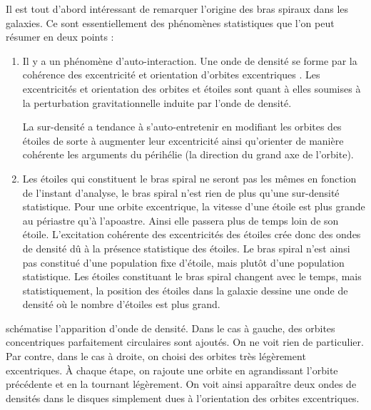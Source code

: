 \bigskip

Il est tout d'abord intéressant de remarquer l'origine des bras spiraux dans les galaxies. Ce sont essentiellement des phénomènes statistiques que l'on peut résumer en deux points : 
\begin{enumerate}
\item Il y a un phénomène d'auto-interaction. Une onde de densité se forme par la cohérence des excentricité et orientation d'orbites excentriques . Les excentricités et orientation des orbites et étoiles sont quant à elles soumises à la perturbation gravitationnelle induite par l'onde de densité. 

La sur-densité a tendance à s'auto-entretenir en modifiant les orbites des étoiles de sorte à augmenter leur excentricité ainsi qu'orienter de manière cohérente les arguments du périhélie (la direction du grand axe de l'orbite).
\item Les étoiles qui constituent le bras spiral ne seront pas les mêmes en fonction de l'instant d'analyse, le bras spiral n'est rien de plus qu'une sur-densité statistique. Pour une orbite excentrique, la vitesse d'une étoile est plus grande au périastre qu'à l'apoastre. Ainsi elle passera plus de temps loin de son étoile. L'excitation cohérente des excentricités des étoiles crée donc des ondes de densité dû à la présence statistique des étoiles. Le bras spiral n'est ainsi pas constitué d'une population fixe d'étoile, mais plutôt d'une population statistique. Les étoiles constituant le bras spiral changent avec le temps, mais statistiquement, la position des étoiles dans la galaxie dessine une onde de densité où le nombre d'étoiles est plus grand.
\end{enumerate}

 schématise l'apparition d'onde de densité. Dans le cas à gauche, des orbites concentriques parfaitement circulaires sont ajoutés. On ne voit rien de particulier. Par contre, dans le cas à droite, on choisi des orbites très légèrement excentriques. À chaque étape, on rajoute une orbite en agrandissant l'orbite précédente et en la tournant légèrement. On voit ainsi apparaître deux ondes de densités dans le disques simplement dues à l'orientation des orbites excentriques.

